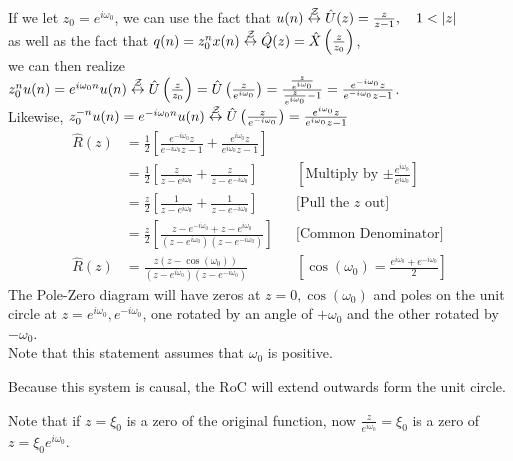 If we let $z_0=e^{i\omega_0}$, we can use the fact that $u(n)\zt \hat U(z)=\frac{z}{z-1},\quad1<|z|$\\
as well as the fact that $q(n)=z_{0}^{n} x(n)\stackrel{\mathcal{Z}}{\leftrightarrow} \hat Q(z)=\hat{X}\left(\frac{z}{z_0}\right)$,\\
we can then realize $z_0^n u(n)
=e^{i\omega_0n}u(n)
\stackrel{\mathcal{Z}}{\leftrightarrow}
\hat U\left({\frac{z}{z_0}}\right)
=\hat U\left({\frac{z}{e^{i\omega_0}}}\right)
=\frac{\frac{z}{e^{i\omega_0}}}{\frac{z}{e^{i\omega_0}}-1}
=\frac{{e^{-i\omega_0}{z}}}{{e^{-i\omega_0}{z}}-1}$.\\
Likewise, $z_0^{-n} u(n)
=e^{-i\omega_0n}u(n)
\stackrel{\mathcal{Z}}{\leftrightarrow}
\hat U\left({\frac{z}{e^{-i\omega_0}}}\right)
=\frac{{e^{i\omega_0}{z}}}{{e^{i\omega_0}{z}}-1}$
\begin{align*}
    \hat R(z) 
    &=
    \frac12
    \left[
        \frac{{e^{-i\omega_0}{z}}}{{e^{-i\omega_0}{z}}-1}
        +
        \frac{{e^{i\omega_0}{z}}}{{e^{i\omega_0}{z}}-1}
    \right]
    \\
    &=
    \frac12
    \left[
        \frac{{{z}}}{{{z}}-e^{i\omega_0}}
        +
        \frac{{{z}}}{{{z}}-e^{-i\omega_0}}
    \right]
    &&\left[\text{Multiply by $\pm\frac{e^{i\omega_0}}{e^{i\omega_0}}$}\right]
    \\
    &=
    \frac{z}2
    \left[
        \frac{1}{{{z}}-e^{i\omega_0}}
        +
        \frac{1}{{{z}}-e^{-i\omega_0}}
    \right]
    &&\text{[Pull the $z$ out]}
    \\
    &=
    \frac{z}2
    \left[
        \frac{z-e^{-i\omega_0} + z-e^{i\omega_0}}{(z-e^{i\omega_0})(z-e^{-i\omega_0})}
    \right]
    &&\text{[Common Denominator]}
    \\
    \hat R(z) 
    &=
    \frac{z(z-\cos(\omega_0))}{(z-e^{i\omega_0})(z-e^{-i\omega_0})}
    &&\left[\cos(\omega_0)=\frac{e^{i\omega_0}+e^{-i\omega_0}}{2}\right]
\end{align*}
The Pole-Zero diagram will have zeros at $z=0, \cos(\omega_0)$ and poles on the unit circle at $z=e^{i\omega_0}, e^{-i\omega_0}$, one rotated by an angle of $+\omega_0$ and the other rotated by $-\omega_0$.\\
Note that this statement assumes that $\omega_0$ is positive.

Because this system is causal, the RoC will extend outwards form the unit circle.

\begin{shaded}
Note that if $z=\xi_0$ is a zero of the original function, now $\frac{z}{e^{i\omega_0}}=\xi_0$ is a zero of $z=\xi_0e^{i\omega_0}$.
\end{shaded}

